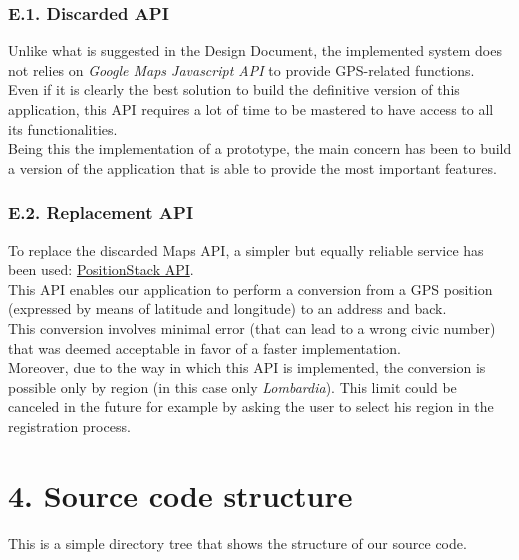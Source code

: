 \subsection{E.1. Discarded API}

Unlike what is suggested in the Design Document, the implemented system does not relies on \emph{Google Maps Javascript API} to provide GPS-related functions.\\
Even if it is clearly the best solution to build the definitive version of this application, this API requires a lot of time to be mastered to have access to all its functionalities.\\
Being this the implementation of a prototype, the main concern has been to build a version of the application that is able to provide the most important features.

\subsection{E.2. Replacement API}

To replace the discarded Maps API, a simpler but equally reliable service has been used: \href{https://positionstack.com/documentation}{PositionStack API}.\\
This API enables our application to perform a conversion from a GPS position (expressed by means of latitude and longitude) to an address and back.\\
This conversion involves minimal error (that can lead to a wrong civic number) that was deemed acceptable in favor of a faster implementation.\\
Moreover, due to the way in which this API is implemented, the conversion is possible only by region (in this case only \emph{Lombardia}). This limit could be canceled in the future for example by asking the user to select his region in the registration process.

\chapter{4. Source code structure}

This is a simple directory tree that shows the structure of our source code.

